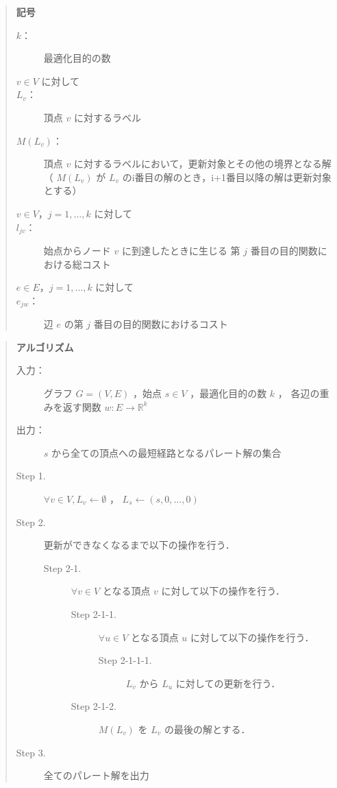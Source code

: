 \documentclass[12pt]{optlab-bachelor}
\begin{document}
\begin{quote}
  \textbf{記号}
  \begin{description}
    \item[$k$：] 最適化目的の数
    \item[$v \in V$ に対して]
    \item[$L_v$：] 頂点 $v$ に対するラベル
    \item[$M(L_v)$：] 頂点 $v$ に対するラベルにおいて，更新対象とその他の境界となる解
    （ $M(L_v)$ が $L_v$ のi番目の解のとき，i+1番目以降の解は更新対象とする）
    \item[$v \in V$，$j = 1 , \ldots , k$ に対して]
    \item[$l_{jv}$：] 始点からノード $v$ に到達したときに生じる
    第 $j$ 番目の目的関数における総コスト
    \item[$e \in E$，$j = 1 , \ldots , k$ に対して]
    \item[$e_{jw}$：] 辺 $e$ の第 $j$ 番目の目的関数におけるコスト
  \end{description}
\end{quote}

\begin{quote}
  \textbf{アルゴリズム}
  \begin{description}
    \item[入力：] グラフ $G=(V,E)$ ，始点 $s \in V$ ，最適化目的の数 $k$ ，
    各辺の重みを返す関数 $w : E \to \mathbb{R}^k$
    \item[出力：] $s$ から全ての頂点への最短経路となるパレート解の集合
    \item[Step 1.] $\forall v \in V , L_v \leftarrow \emptyset$ ，
    $L_s \leftarrow (s,0,\ldots,0)$
    \item[Step 2.] 更新ができなくなるまで以下の操作を行う．
    \begin{description}
      \item[Step 2-1.] $\forall v \in V$ となる頂点 $v$ に対して以下の操作を行う．
      \begin{description}
        \item[Step 2-1-1.] $\forall u \in V$ となる頂点 $u$ に対して以下の操作を行う．
        \begin{description}
          \item[Step 2-1-1-1.] $L_v$ から $L_u$ に対しての更新を行う．
        \end{description}
        \item[Step 2-1-2.] $M(L_v)$ を $L_v$ の最後の解とする．
      \end{description}
    \end{description}
    \item[Step 3.] 全てのパレート解を出力
  \end{description}
\end{quote}
\end{document}
